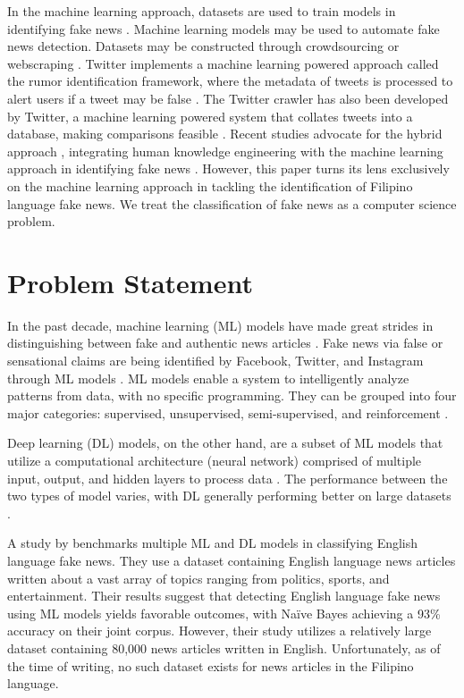 In the machine learning approach, datasets are used to train models in identifying fake news \cite{debeer2020approaches}. Machine learning models may be used to automate fake news detection. Datasets may be constructed through crowdsourcing \cite{perezrosas2018automatic} or webscraping \cite{cruz2020localization}. Twitter implements a machine learning powered approach called the rumor identification framework, where the metadata of tweets is processed to alert users if a tweet may be false \cite{sivasangari2018modern}. The Twitter crawler has also been developed by Twitter, a machine learning powered system that collates tweets into a database, making comparisons feasible \cite{atodiresei2018identifying}. Recent studies advocate for the hybrid approach \cite{debeer2020approaches}, integrating human knowledge engineering with the machine learning approach in identifying fake news \cite{ruchansky2017csi, okoro2018hybrid}. However, this paper turns its lens exclusively on the machine learning approach in tackling the identification of Filipino language fake news. We treat the classification of fake news as a computer science problem.

\section{Problem Statement}

In the past decade, machine learning (ML) models have made
great strides in distinguishing between fake and authentic news articles \cite{ahmed2021detecting}. Fake news via false or sensational claims are being identified by Facebook, Twitter, and Instagram through ML models \cite{debeer2020approaches}. ML models enable a system to intelligently analyze patterns from data, with no specific programming. They can be grouped into four major categories: supervised, unsupervised, semi-supervised, and reinforcement \cite{sarker2021machine}.

Deep learning (DL) models, on the other hand, are a subset of ML models that utilize a computational architecture (neural network) comprised of multiple input, output, and hidden layers to process data \cite{sarker2021machine}. The performance between the two types of model varies, with DL generally performing better on large datasets \cite{xin2018machine, sarker2020cybersecurity}.

A study by  benchmarks multiple ML and DL models in classifying English language fake news. They use a dataset containing English language news articles written about a vast array of topics ranging from politics, sports, and entertainment. Their results suggest that detecting English language fake news using ML models yields favorable outcomes, with Naïve Bayes achieving a 93\% accuracy on their joint corpus. However, their study utilizes a relatively large dataset containing 80,000 news articles written in English. Unfortunately, as of the time of writing, no such dataset exists for news articles in the Filipino language.

